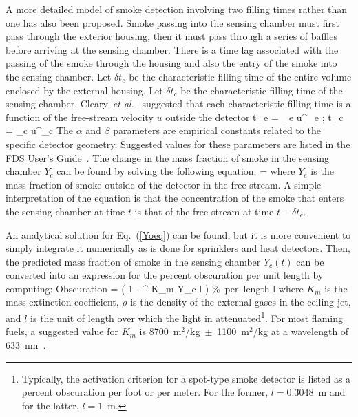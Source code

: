 A more detailed model of smoke detection involving two filling times rather than one has also been proposed.
Smoke passing into the sensing chamber must first pass through the exterior housing, then it must pass through a series
of baffles before arriving at the sensing chamber. There is a time lag
associated with the passing of the smoke through the housing and also the entry of the smoke into the sensing chamber.
Let $\delta t_e$ be the characteristic filling time of the entire volume enclosed by the external housing. Let
$\delta t_c$ be the characteristic filling time of the sensing chamber.
Cleary~{\em et al.}~\cite{Cleary:IAFSS6} suggested that each characteristic filling time is a function of the
free-stream velocity $u$ outside the detector
\be
\delta t_e = \alpha_e u^{\beta_e} \quad ; \quad \delta t_c = \alpha_c u^{\beta_c}
\ee
The $\alpha$ and $\beta$ parameters are empirical constants related to the specific detector geometry.
Suggested values for these parameters are listed in the FDS User's Guide~\cite{FDS_Users_Guide}.
The change in the mass fraction of smoke in the sensing chamber $Y_c$ can be found by solving the following equation:
\be
{} =  \label{Yoeq}
\ee
where $Y_e$ is the mass fraction of smoke outside of the detector in the free-stream.
A simple interpretation of the equation is that the concentration of the smoke that enters the sensing chamber at time $t$
is that of the free-stream at time $t-\delta t_e$.

An analytical solution for Eq.~(\ref{Yoeq}) can be found, but it is more convenient to simply integrate it numerically
as is done for sprinklers and heat detectors. Then, the predicted mass fraction of smoke in the sensing chamber
$Y_c(t)$ can be converted into an expression for the percent obscuration per unit length by computing:
\be
   \hbox{Obscuration}  = \left( 1 - ^{-K_m \rho Y_c l} \right)  \; \; \hbox{\% per length} \; l
\ee
where $K_m$ is the mass extinction coefficient, $\rho$ is the density of the external gases in the ceiling jet,
and $l$ is the unit of length over which the light in attenuated\footnote{Typically, the activation criterion for a spot-type smoke detector is listed as a percent obscuration per foot or per meter. For the former, $l=0.3048$~m and for the latter, $l=1$~m.}.
For most flaming fuels, a suggested value for $K_m$ is 8700~m$^2$/kg~$\pm$~1100~m$^2$/kg at a
wavelength of 633~nm~\cite{Mulholland:F+M}.


